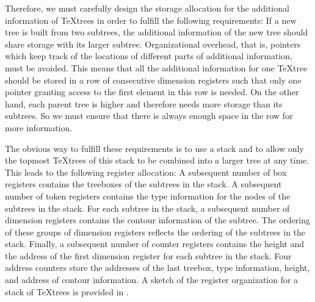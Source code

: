 Therefore, we must carefully design the storage allocation for                  
the additional information of \TeX{}trees in order to fulfill the               
following requirements:                                                         
If a new tree is built from                                                     
two subtrees, the additional information of the new tree should                 
share storage with its larger subtree.                                          
Organizational overhead, that is,                                               
pointers which keep track of the locations of different parts of additional     
information, must be avoided.                                                   
This means that all the additional information                                  
for one \TeX{}tree should be stored in a row of consecutive dimension registers           
such that only one pointer granting access to the first element                        
in this row is needed.                                                          
On the other hand, each parent                                                  
tree is higher and therefore needs more storage than its subtrees.              
So we must ensure that there is always enough space in the row                  
for more information.                                                           
                                                                                
The obvious way to fulfill these requirements is to use a stack and to           
allow only the topmost \TeX{}trees of this stack to be                          
combined into a larger tree at any time.                   
This leads to the following register allocation: A subsequent number of         
box registers contains the treeboxes of the subtrees in the stack. A            
subsequent number of token registers contains the type information for the      
nodes of the subtrees in the stack. For each subtree in the stack,              
a subsequent number of dimension registers contains the contour                 
information of the subtree. The ordering of these groups of dimension           
registers reflects the ordering of the subtrees in the                          
stack. Finally, a subsequent number of counter registers contains               
the height and the address of the first dimension register for                  
each subtree in the stack. Four address counters store the addresses            
of the last treebox, type information, height, and address of contour           
information. A sketch of the register organization for a stack of \TeX{}trees
is provided in .

